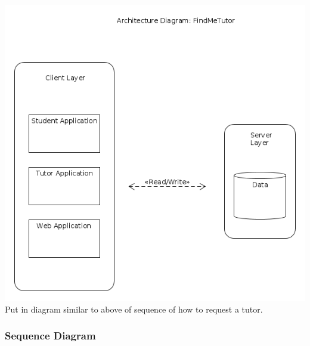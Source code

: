 \documentclass[12pt]{article}
\begin{document}
\includegraphics[width=140mm]{./architecture_diagram.png}
Put in diagram similar to above of sequence of how to request a tutor.\\



\subsubsection{Sequence Diagram}
\end{document}
